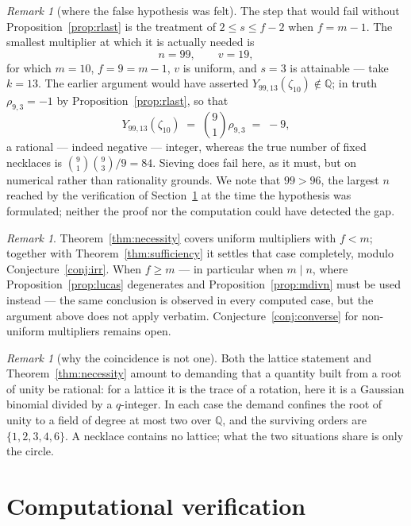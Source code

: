 \documentclass[11pt,a4paper]{article}
\theoremstyle{plain}
\theoremstyle{definition}
\theoremstyle{remark}
\newtheorem{remark}[theorem]{Remark}
\newcommand{\Q}{\mathbb{Q}}
\begin{document}
\begin{remark}[where the false hypothesis was felt]\label{rem:99}
The step that would fail without Proposition~\ref{prop:rlast} is the treatment of
$2\le s\le f-2$ when $f=m-1$. The smallest multiplier at which it is actually needed is
\[
  n=99,\qquad v=19,
\]
for which $m=10$, $f=9=m-1$, $v$ is uniform, and $s=3$ is attainable --- take $k=13$. The
earlier argument would have asserted $Y_{99,13}(\zeta_{10})\notin\Q$; in truth
$\rho_{9,3}=-1$ by Proposition~\ref{prop:rlast}, so that
\[
  Y_{99,13}(\zeta_{10})\;=\;\binom{9}{1}\rho_{9,3}\;=\;-9,
\]
a rational --- indeed negative --- integer, whereas the true number of fixed necklaces is
$\binom91\binom93/9=84$. Sieving does fail here, as it must, but on numerical rather than
rationality grounds. We note that $99>96$, the largest $n$ reached by the verification of
Section~\ref{sec:verification} at the time the hypothesis was formulated; neither the proof
nor the computation could have detected the gap.
\end{remark}

\begin{remark}
Theorem~\ref{thm:necessity} covers uniform multipliers with $f<m$; together with
Theorem~\ref{thm:sufficiency} it settles that case completely, modulo
Conjecture~\ref{conj:irr}. When $f\ge m$ --- in particular when $m\mid n$, where
Proposition~\ref{prop:lucas} degenerates and Proposition~\ref{prop:mdivn} must be used
instead --- the same conclusion is observed in every computed case, but the argument above
does not apply verbatim. Conjecture~\ref{conj:converse} for non-uniform multipliers remains
open.
\end{remark}

\begin{remark}[why the coincidence is not one]
Both the lattice statement and Theorem~\ref{thm:necessity} amount to demanding that a
quantity built from a root of unity be rational: for a lattice it is the trace of a
rotation, here it is a Gaussian binomial divided by a $q$-integer. In each case the demand
confines the root of unity to a field of degree at most two over $\Q$, and the surviving
orders are $\{1,2,3,4,6\}$. A necklace contains no lattice; what the two situations share is
only the circle.
\end{remark}

\section{Computational verification}\label{sec:verification}
\end{document}
